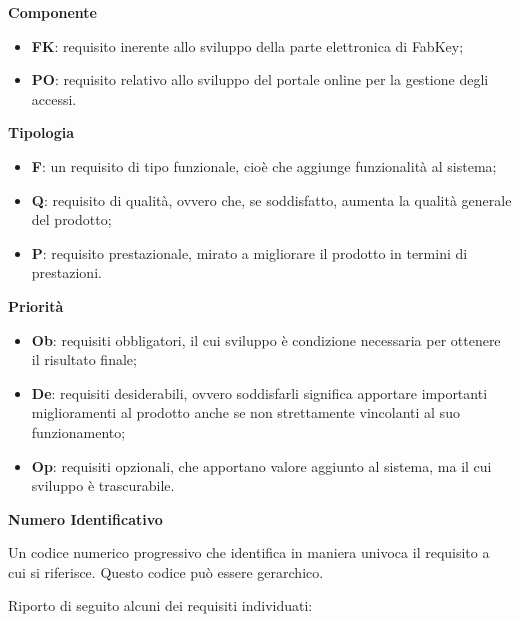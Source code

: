 \textbf{Componente}
\begin{itemize}
\item \textbf{FK}: requisito inerente allo sviluppo della parte elettronica di FabKey;
\item \textbf{PO}: requisito relativo allo sviluppo del portale online per la gestione degli accessi.
\end{itemize}

\textbf{Tipologia}
\begin{itemize}
\item \textbf{F}: un requisito di tipo funzionale, cioè che aggiunge funzionalità al sistema;
\item \textbf{Q}: requisito di qualità, ovvero che, se soddisfatto, aumenta la qualità generale del prodotto;
\item \textbf{P}: requisito prestazionale, mirato a migliorare il prodotto in termini di prestazioni.
\end{itemize}

\textbf{Priorità}
\begin{itemize}
\item \textbf{Ob}: requisiti obbligatori, il cui sviluppo è condizione necessaria per ottenere il risultato finale;
\item \textbf{De}: requisiti desiderabili, ovvero soddisfarli significa apportare importanti miglioramenti al prodotto anche se non strettamente vincolanti al suo funzionamento;
\item \textbf{Op}: requisiti opzionali, che apportano valore aggiunto al sistema, ma il cui sviluppo è trascurabile.
\end{itemize}

\textbf{Numero Identificativo}

\medskip

Un codice numerico progressivo che identifica in maniera univoca il requisito a cui si riferisce. Questo codice può essere gerarchico.

\bigskip

Riporto di seguito alcuni dei requisiti individuati:

\medskip

